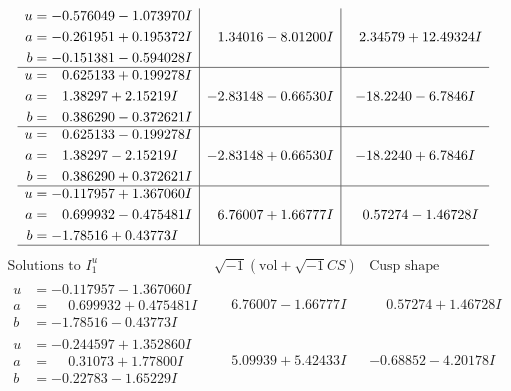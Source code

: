 \documentclass[1p]{elsarticle_modified}
\theoremstyle{definition}
\newcommand{\I}{\sqrt{-1}}
\begin{document}
$$\begin{array}{c|c|c}
\begin{aligned}
u &= -0.576049 - 1.073970 I \\
a &= -0.261951 + 0.195372 I \\
b &= -0.151381 - 0.594028 I\end{aligned}
 & \phantom{-}1.34016 - 8.01200 I & \phantom{-}2.34579 + 12.49324 I \\ \hline\begin{aligned}
u &= \phantom{-}0.625133 + 0.199278 I \\
a &= \phantom{-}1.38297 + 2.15219 I \\
b &= \phantom{-}0.386290 - 0.372621 I\end{aligned}
 & -2.83148 - 0.66530 I & -18.2240 - 6.7846 I \\ \hline\begin{aligned}
u &= \phantom{-}0.625133 - 0.199278 I \\
a &= \phantom{-}1.38297 - 2.15219 I \\
b &= \phantom{-}0.386290 + 0.372621 I\end{aligned}
 & -2.83148 + 0.66530 I & -18.2240 + 6.7846 I \\ \hline\begin{aligned}
u &= -0.117957 + 1.367060 I \\
a &= \phantom{-}0.699932 - 0.475481 I \\
b &= -1.78516 + 0.43773 I\end{aligned}
 & \phantom{-}6.76007 + 1.66777 I & \phantom{-}0.57274 - 1.46728 I\\
 \hline 
 \end{array}$$\newpage$$\begin{array}{c|c|c}  
\text{Solutions to }I^u_{1}& \I (\text{vol} + \sqrt{-1}CS) & \text{Cusp shape}\\
 \hline 
\begin{aligned}
u &= -0.117957 - 1.367060 I \\
a &= \phantom{-}0.699932 + 0.475481 I \\
b &= -1.78516 - 0.43773 I\end{aligned}
 & \phantom{-}6.76007 - 1.66777 I & \phantom{-}0.57274 + 1.46728 I \\ \hline\begin{aligned}
u &= -0.244597 + 1.352860 I \\
a &= \phantom{-}0.31073 + 1.77800 I \\
b &= -0.22783 - 1.65229 I\end{aligned}
 & \phantom{-}5.09939 + 5.42433 I & -0.68852 - 4.20178 I \\ \hline\begin{aligned}

\end{aligned}
\end{array}$$
\end{document}
